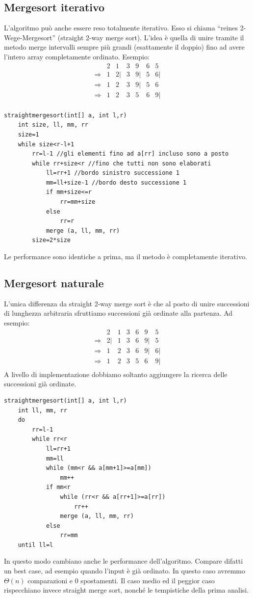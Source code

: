 \documentclass[a4paper]{book}
\begin{document}
\subsection*{Mergesort iterativo}
L'algoritmo può anche essere reso totalmente iterativo. Esso si chiama ``reines 2-Wege-Mergesort'' (straight 2-way merge sort). L'idea è quella di unire tramite il metodo merge intervalli sempre più grandi (esattamente il doppio) fino ad avere l'intero array completamente ordinato. Esempio:
\[\begin{array}{*{20}{c}}
{}&{2}&1&{3}&{9}&6&5\\
{\Rightarrow}&1&{2|}&{3}&{9|}&5&{6|}\\
{\Rightarrow}&1&{2}&{3}&{9|}&5&6\\
{\Rightarrow}&1&{2}&{3}&5&{6}&{9|}\\
\end{array}\]
\begin{lstlisting}
straightmergesort(int[] a, int l,r)
	int size, ll, mm, rr
	size=1
	while size<r-l+1
		rr=l-1 //gli elementi fino ad a[rr] incluso sono a posto
		while rr+size<r //fino che tutti non sono elaborati
			ll=rr+1 //bordo sinistro successione 1
			mm=ll+size-1 //bordo desto successione 1
			if mm+size<=r
				rr=mm+size
			else
				rr=r
			merge (a, ll, mm, rr)
		size=2*size				
\end{lstlisting}
Le performance sono identiche a prima, ma il metodo è completamente iterativo.
\subsection*{Mergesort naturale}
L'unica differenza da straight 2-way merge sort è che al posto di unire successioni di lunghezza arbitraria sfruttiamo successioni già ordinate alla partenza. Ad esempio:
\[\begin{array}{*{20}{c}}
{}&{2}&1&{3}&{6}&9&5\\
{\Rightarrow}&{2|}&{1}&{3}&{6}&{9|}&{5}\\
{\Rightarrow}&1&{2}&{3}&{6}&{9|}&{6|}\\
{\Rightarrow}&1&{2}&{3}&5&{6}&{9|}\\
\end{array}\]
A livello di implementazione dobbiamo soltanto aggiungere la ricerca delle successioni già ordinate.
\begin{lstlisting}
straightmergesort(int[] a, int l,r)
	int ll, mm, rr
	do
		rr=l-1
		while rr<r
			ll=rr+1
			mm=ll	
			while (mm<r && a[mm+1]>=a[mm])
				mm++
			if mm<r
				while (rr<r && a[rr+1]>=a[rr])
					rr++
				merge (a, ll, mm, rr)
			else
				rr=mm
	until ll=l								
\end{lstlisting}
In questo modo cambiano anche le performance dell'algoritmo. Compare difatti un best case, ad esempio quando l'input è già ordinato. In questo caso avremmo $\Theta (n)$ comparazioni e 0 spostamenti. Il caso medio ed il peggior caso rispecchiano invece straight merge sort, nonché le tempistiche della prima analisi.
\end{document}
